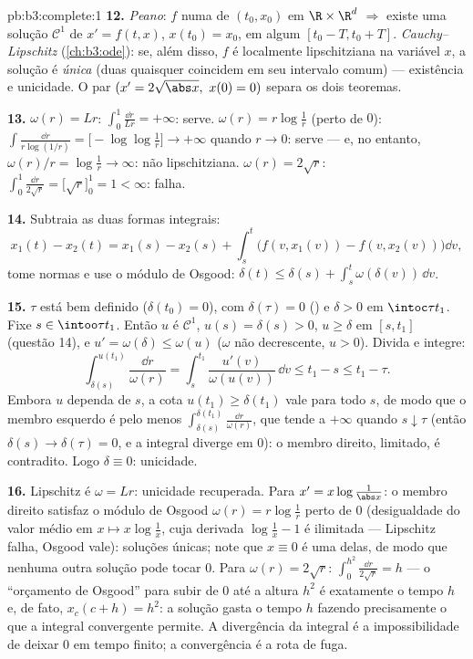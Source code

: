 \begin{solution}{pb:b3:complete:1}
\textbf{12.} \emph{Peano}: $f$  numa  de
$(t_0, x_0)$ em $\R\times\R^d$ $\Rightarrow$ existe uma solução
$\mathcal C^1$ de $x' = f(t,x)$, $x(t_0) = x_0$, em
algum $[t_0 - T, t_0 + T]$. \emph{Cauchy--Lipschitz}
(\cref{ch:b3:ode}): se, além disso, $f$ é localmente lipschitziana na
variável $x$, a solução é \emph{única} (duas quaisquer coincidem em
seu intervalo comum) --- existência e unicidade. O par
$(x' = 2\sqrt{\abs x},\ x(0) = 0)$ separa os dois teoremas.

\textbf{13.} $\omega(r) = Lr$: $\int_0^1\frac{\dd r}{Lr} =
+\infty$: serve. $\omega(r) = r\log\frac1r$ (perto de $0$):
$\int\frac{\dd r}{r\log(1/r)} = \bigl[-\log\log\frac1r\bigr]
\to +\infty$ quando $r \to 0$: serve --- e, no entanto, $\omega(r)/r =
\log\frac1r \to \infty$: não lipschitziana. $\omega(r) = 2\sqrt
r$: $\int_0^1\frac{\dd r}{2\sqrt r} = \bigl[\sqrt r\bigr]_0^1
= 1 < \infty$: falha.

\textbf{14.} Subtraia as duas formas integrais:
\[
x_1(t) - x_2(t) = x_1(s) - x_2(s) + \int_s^t\bigl(f(v,
x_1(v)) - f(v, x_2(v))\bigr)\dd v,
\]
tome normas e use o módulo de Osgood: $\delta(t) \leq
\delta(s) + \int_s^t\omega(\delta(v))\,\dd v$.

\textbf{15.} $\tau$ está bem definido ($\delta(t_0) = 0$), com
$\delta(\tau) = 0$ () e $\delta > 0$ em
$\intoc\tau{t_1}$. Fixe $s \in \intoo\tau{t_1}$. Então $u$ é
$\mathcal C^1$, $u(s) = \delta(s) > 0$, $u \geq \delta$ em
$[s, t_1]$ (questão 14), e $u' = \omega(\delta) \leq
\omega(u)$ ($\omega$ não decrescente, $u > 0$). Divida e
integre:
\[
\int_{\delta(s)}^{u(t_1)}\frac{\dd r}{\omega(r)}
= \int_s^{t_1}\frac{u'(v)}{\omega(u(v))}\,\dd v \leq t_1 - s
\leq t_1 - \tau .
\]
Embora $u$ dependa de $s$, a cota $u(t_1) \geq
\delta(t_1)$ vale para todo $s$, de modo que o membro esquerdo é pelo
menos $\int_{\delta(s)}^{\delta(t_1)}\frac{\dd r}{\omega(r)}$,
que tende a $+\infty$ quando $s \downarrow \tau$ (então
$\delta(s) \to \delta(\tau) = 0$, e a integral diverge
em $0$): o membro direito, limitado, é contradito. Logo
$\delta \equiv 0$: unicidade.

\textbf{16.} Lipschitz é $\omega = Lr$: unicidade recuperada.
Para $x' = x\log\frac1{\abs x}$: o membro direito satisfaz o
módulo de Osgood $\omega(r) = r\log\frac1r$ perto de $0$ (desigualdade do valor
médio em $x \mapsto x\log\frac1x$, cuja derivada
$\log\frac1x - 1$ é ilimitada --- Lipschitz falha, Osgood
vale): soluções únicas; note que $x \equiv 0$ é uma delas, de modo que nenhuma
outra solução pode tocar $0$. Para $\omega(r) = 2\sqrt r$:
$\int_0^{h^2}\frac{\dd r}{2\sqrt r} = h$ --- o ``orçamento de
Osgood'' para subir de $0$ até a altura $h^2$ é exatamente o
tempo $h$ e, de fato, $x_c(c + h) = h^2$: a solução gasta o
tempo $h$ fazendo precisamente o que a integral convergente
permite. A divergência da integral é a impossibilidade de
deixar $0$ em tempo finito; a convergência é a rota de fuga.


\end{solution}
